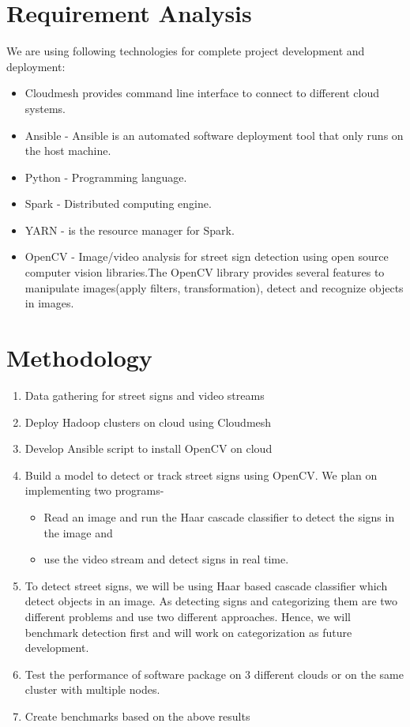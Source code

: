 \documentclass[9pt,twocolumn,twoside]{../../styles/osajnl}
\begin{document}
\section{Requirement Analysis}
We are using following technologies for complete project development
and deployment:
\begin{itemize}
\item Cloudmesh provides command line interface to connect to
  different cloud systems.
\item Ansible - Ansible is an automated software deployment tool that
  only runs on the host machine.
\item Python - Programming language.
\item Spark - Distributed computing engine.
\item YARN - is the resource manager for Spark.

\item OpenCV \cite{www-opencv} - Image/video analysis for street sign
  detection using open source computer vision libraries.The OpenCV
  library provides several features to manipulate images(apply
  filters, transformation), detect and recognize objects in images.
\end{itemize}

\section{Methodology}
\begin{enumerate}
\item Data gathering for street signs and video streams
\item Deploy Hadoop clusters on cloud using Cloudmesh
\item Develop Ansible script to install OpenCV on cloud
\item Build a model to detect or track street signs using OpenCV. We
  plan on implementing two programs-
    \begin{itemize}
    \item Read an image and run the Haar cascade classifier to detect
      the signs in the image and
    \item use the video stream and detect signs in real time.
    \end{itemize}
\item To detect street signs, we will be using Haar based cascade
  classifier which detect objects in an image. As detecting signs and
  categorizing them are two different problems and use two different
  approaches. Hence, we will benchmark detection first and will work
  on categorization as future development.
\item Test the performance of software package on 3 different clouds
  or on the same cluster with multiple nodes.
\item Create benchmarks based on the above results

\end{enumerate}
\end{document}
